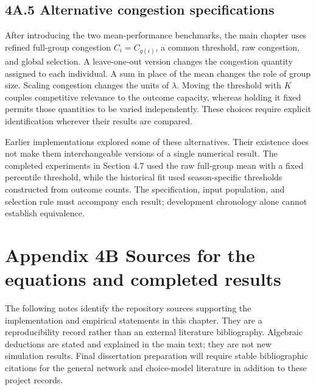 \subsection*{4A.5 Alternative congestion specifications}\label{a.5-alternative-congestion-specifications}

After introducing the two mean-performance benchmarks, the main chapter uses refined full-group congestion \(C_i=C_{g(i)}\), a common threshold, raw congestion, and global selection. A leave-one-out version changes the congestion quantity assigned to each individual. A sum in place of the mean changes the role of group size. Scaling congestion changes the units of \(\lambda\). Moving the threshold with \(K\) couples competitive relevance to the outcome capacity, whereas holding it fixed permits those quantities to be varied independently. These choices require explicit identification wherever their results are compared.

Earlier implementations explored some of these alternatives. Their existence does not make them interchangeable versions of a single numerical result. The completed experiments in Section 4.7 used the raw full-group mean with a fixed percentile threshold, while the historical fit used season-specific thresholds constructed from outcome counts. The specification, input population, and selection rule must accompany each result; development chronology alone cannot establish equivalence.

\clearpage
\section*{Appendix 4B Sources for the equations and completed results}\label{appendix-4b-sources-for-the-equations-and-completed-results}

The following notes identify the repository sources supporting the implementation and empirical statements in this chapter. They are a reproducibility record rather than an external literature bibliography. Algebraic deductions are stated and explained in the main text; they are not new simulation results. Final dissertation preparation will require stable bibliographic citations for the general network and choice-model literature in addition to these project records.

